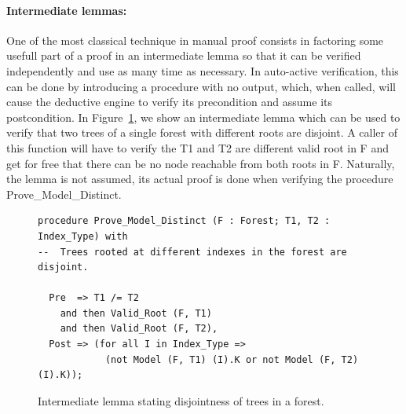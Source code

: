 \documentclass[11pt,a4paper]{article}
\begin{document}
\paragraph{Intermediate lemmas:}
One of the most classical technique in manual proof consists in factoring some usefull
part of a proof in an intermediate lemma so that it can be verified independently and
use as many time as necessary. In auto-active verification, this can be done by introducing
a procedure with no output, which, when called, will cause the deductive engine to verify
its precondition and assume its postcondition. In Figure~\ref{fig-proof-lem}, we show an
intermediate lemma which can be used to verify that two trees of a single forest with different
roots are disjoint. A caller of this function will have to verify the T1 and T2 are different
valid root in F and get for free that there can be no node reachable from both roots in F.
Naturally, the lemma is not assumed, its actual proof is done when verifying the procedure
Prove\_Model\_Distinct.

\begin{figure}
\begin{small}
\begin{lstlisting}
procedure Prove_Model_Distinct (F : Forest; T1, T2 : Index_Type) with
--  Trees rooted at different indexes in the forest are disjoint.

  Pre  => T1 /= T2
    and then Valid_Root (F, T1)
    and then Valid_Root (F, T2),
  Post => (for all I in Index_Type =>
            (not Model (F, T1) (I).K or not Model (F, T2) (I).K));
\end{lstlisting}
\end{small}
\caption{\label{fig-proof-lem} Intermediate lemma stating disjointness of trees in a forest.}
\end{figure}
\end{document}
